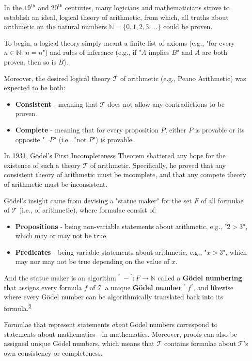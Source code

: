 In the $19^\text{th}$ and $20^\text{th}$ centuries, many logicians and mathematicians strove to establish an ideal, logical theory of arithmetic, from which, all truths about arithmetic on the natural numbers $\mathbb{N} = \{0,1,2,3,...\}$ could be proven.

To begin, a logical theory simply meant a finite list of axioms (e.g., "for every $n \in \mathbb{N}$: $n = n$") and rules of inference (e.g., if "$A$ implies $B$" and $A$ are both proven, then so is $B$).

Moreover, the desired logical theory $\mathcal{T}$ of arithmetic (e.g., Peano Arithmetic) was expected to be both:
\begin{itemize}
    \item \textbf{Consistent} - meaning that $\mathcal{T}$ does not allow any contradictions to be proven.
    \item \textbf{Complete} - meaning that for every proposition $P$, either $P$ is provable or its opposite "$\neg P$" (i.e., "not $P$") is provable.
\end{itemize}

In 1931, Gödel's First Incompleteness Theorem shattered any hope for the existence of such a theory $\mathcal{T}$ of arithmetic. Specifically, he proved that any consistent theory of arithmetic must be incomplete, and that any compete theory of arithmetic must be inconsistent.

Gödel's insight came from devising a "statue maker" for the set $F$ of all formulae of $\mathcal{T}$ (i.e., of arithmetic), where formulae consist of:
\begin{itemize}
    \item \textbf{Propositions} - being non-variable statements about arithmetic, e.g., "$2 > 3$", which may or may not be true.
    \item \textbf{Predicates} - being variable statements about arithmetic, e.g., "$x > 3$", which may nor may not be true depending on the value of $x$.
\end{itemize}
And the statue maker is an algorithm ${}^\ulcorner\ - {}^\urcorner: F \rightarrow \mathbb{N}$ called a \textbf{Gödel numbering} that assigns every formula $f$ of $\mathcal{T}$ a unique \textbf{Gödel number} ${}^\ulcorner\ f {}^\urcorner$, and likewise where every Gödel number can be algorithmically translated back into its formula.\textsuperscript{\href{#footnote-2}{2}}

Formulae that represent statements \textit{about} Gödel numbers correspond to statements about mathematics - in mathematics. Moreover, proofs can also be assigned unique Gödel numbers, which means that $\mathcal{T}$ contains formulae about $\mathcal{T}$'s own consistency or completeness.


